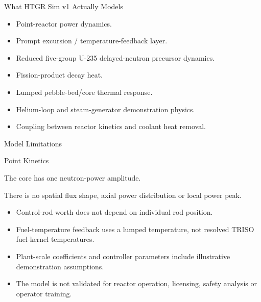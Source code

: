 \documentclass[aspectratio=169]{beamer}
\begin{document}
\begin{frame}{What HTGR Sim v1 Actually Models}

    \begin{itemize}

        \item Point-reactor power dynamics.

        \item Prompt excursion / temperature-feedback layer.

        \item Reduced five-group U-235 delayed-neutron precursor dynamics.

        \item Fission-product decay heat.

        \item Lumped pebble-bed/core thermal response.

        \item Helium-loop and steam-generator demonstration physics.

        \item Coupling between reactor kinetics and coolant heat removal.

    \end{itemize}

\end{frame}



\begin{frame}{Model Limitations}

    \begin{alertblock}{Point Kinetics}

        The core has one neutron-power amplitude.

        There is no spatial flux shape, axial power distribution or local
        power peak.

    \end{alertblock}

    \begin{itemize}

        \item Control-rod worth does not depend on individual rod position.

        \item Fuel-temperature feedback uses a lumped temperature, not resolved
              TRISO fuel-kernel temperatures.

        \item Plant-scale coefficients and controller parameters include
              illustrative demonstration assumptions.

        \item The model is not validated for reactor operation, licensing,
              safety analysis or operator training.

    \end{itemize}

\end{frame}
\end{document}
